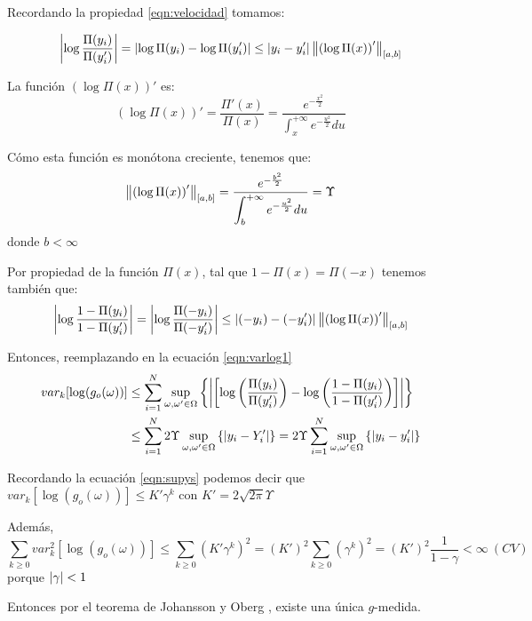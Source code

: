Recordando la propiedad \eqref{eqn:velocidad} tomamos:

\begin{equation}
    \left|\log \frac{\Pi(y_i)}{\Pi(y_i')}\right| = \left|\log \Pi(y_i)  -\log \Pi(y_i')\right| \leq \left|y_i-y_i'\right| \left\lVert\left(\log \Pi(x)\right)'\right\rVert_{[a,b]}
\end{equation}


La función $(\log \Pi(x))'$ es:
\begin{equation}
    (\log \Pi(x))' = \frac{\Pi'(x)}{\Pi(x)} = \frac{e^{-\frac{x^2}{2}}}{\displaystyle \int_x^{+\infty}e^{-\frac{u^2}{2}}du}
\end{equation}

Cómo esta función es monótona creciente, tenemos que:
\begin{equation}
    \left\lVert\left(\log \Pi(x)\right)'\right\rVert_{[a,b]} = \frac{e^{-\frac{b^2}{2}}}{\displaystyle \int_b^{+\infty}e^{-\frac{u^2}{2}}du} = \Upsilon
\end{equation}
donde $b<\infty$

Por propiedad de la función $\Pi(x)$, tal que $1-\Pi(x)=\Pi(-x)$ tenemos también que:
\begin{equation}
    \left|\log \frac{1-\Pi(y_i)}{1-\Pi(y_i')}\right| = 
    \left|\log \frac{\Pi(-y_i)}{\Pi(-y_i')}\right|  \leq \left|(-y_i)-(-y_i')\right| \left\lVert\left(\log \Pi(x)\right)'\right\rVert_{[a,b]}
\end{equation}

Entonces, reemplazando en la ecuación \eqref{eqn:varlog1}
\begin{align*}
  var_k[\log(g_o(\omega))] & \leq \sum_{i=1}^N \sup_{\omega,\omega' \in \Omega} \left\{  \left| \left[ \log\left(\frac{\Pi(y_i)}{\Pi(y_i')}\right) - \log\left(\frac{1-\Pi(y_i)}{1-\Pi(y_i')}\right) \right]\right| \right\} \\
  & \leq \sum_{i=1}^N 2 \Upsilon \sup_{\omega,\omega' \in \Omega} \left\{  \left|y_i-Y_i'\right| \right\} = 2 \Upsilon  \sum_{i=1}^N \sup_{\omega,\omega' \in \Omega} \left\{  \left|y_i-y_i'\right| \right\}
\end{align*}

Recordando la ecuación \eqref{eqn:supys} podemos decir que $var_k[\log(g_o(\omega))] \leq K' \gamma^k$ con $K'=2 \sqrt{2 \pi} \Upsilon$

Además,
\begin{equation*}
    \sum_{k\geq 0} var^2_k[\log(g_o(\omega))] \leq \sum_{k\geq 0} (K' \gamma^k)^2 =(K')^2 \sum_{k\geq 0} (\gamma^k)^2 = (K')^2 \frac{1}{1-\gamma} < \infty \  (CV)
\end{equation*}
porque $\left|\gamma\right|<1$

Entonces por el teorema de Johansson y Oberg \cite{johansson_square_2003}, existe una única $g$-medida.
